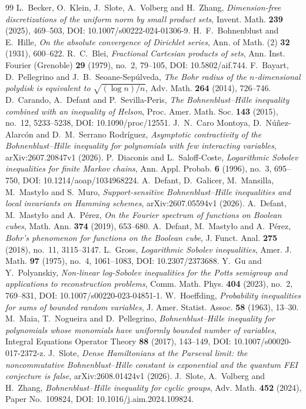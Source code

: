 \documentclass[11pt,a4paper]{article}
\numberwithin{equation}{section}
\theoremstyle{cleanplain}
\theoremstyle{cleandefinition}
\theoremstyle{cleanremark}
\begin{document}
\begin{thebibliography}{99}
\small
{}
L.~Becker, O.~Klein, J.~Slote, A.~Volberg and H.~Zhang,
\emph{Dimension-free discretizations of the uniform norm by small product sets},
Invent. Math. \textbf{239} (2025), 469--503,
DOI: 10.1007/s00222-024-01306-9.
H.~F.~Bohnenblust and E.~Hille,
\emph{On the absolute convergence of Dirichlet series},
Ann. of Math. (2) \textbf{32} (1931), 600--622.
R.~C.~Blei,
\emph{Fractional Cartesian products of sets},
Ann. Inst. Fourier (Grenoble) \textbf{29} (1979), no.~2, 79--105,
DOI: 10.5802/aif.744.
F.~Bayart, D.~Pellegrino and J.~B.~Seoane-Sep\'ulveda,
\emph{The Bohr radius of the $n$-dimensional polydisk is equivalent to
$\sqrt{(\log n)/n}$},
Adv. Math. \textbf{264} (2014), 726--746.
D.~Carando, A.~Defant and P.~Sevilla-Peris,
\emph{The Bohnenblust--Hille inequality combined with an inequality of Helson},
Proc. Amer. Math. Soc. \textbf{143} (2015), no.~12, 5233--5238,
DOI: 10.1090/proc/12551.
J.~N.~Caro Montoya, D.~N\'u\~nez-Alarc\'on and D.~M.~Serrano Rodr\'iguez,
\emph{Asymptotic contractivity of the Bohnenblust--Hille inequality for
polynomials with few interacting variables},
arXiv:2607.20847v1 (2026).
P.~Diaconis and L.~Saloff-Coste,
\emph{Logarithmic Sobolev inequalities for finite Markov chains},
Ann. Appl. Probab. \textbf{6} (1996), no.~3, 695--750,
DOI: 10.1214/aoap/1034968224.
A.~Defant, D.~Galicer, M.~Mansilla, M.~Masty\l o and S.~Muro,
\emph{Support-sensitive Bohnenblust--Hille inequalities and local invariants
on Hamming schemes},
arXiv:2607.05594v1 (2026).
A.~Defant, M.~Masty\l o and A.~P\'erez,
\emph{On the Fourier spectrum of functions on Boolean cubes},
Math. Ann. \textbf{374} (2019), 653--680.
A.~Defant, M.~Masty\l o and A.~P\'erez,
\emph{Bohr's phenomenon for functions on the Boolean cube},
J. Funct. Anal. \textbf{275} (2018), no.~11, 3115--3147.
L.~Gross,
\emph{Logarithmic Sobolev inequalities},
Amer. J. Math. \textbf{97} (1975), no.~4, 1061--1083,
DOI: 10.2307/2373688.
Y.~Gu and Y.~Polyanskiy,
\emph{Non-linear log-Sobolev inequalities for the Potts semigroup and applications to reconstruction problems},
Comm. Math. Phys. \textbf{404} (2023), no.~2, 769--831,
DOI: 10.1007/s00220-023-04851-1.
W.~Hoeffding,
\emph{Probability inequalities for sums of bounded random variables},
J. Amer. Statist. Assoc. \textbf{58} (1963), 13--30.
M.~Maia, T.~Nogueira and D.~Pellegrino,
\emph{Bohnenblust--Hille inequality for polynomials whose monomials have
uniformly bounded number of variables},
Integral Equations Operator Theory \textbf{88} (2017), 143--149,
DOI: 10.1007/s00020-017-2372-z.
J.~Slote,
\emph{Dense Hamiltonians at the Parseval limit: the noncommutative
Bohnenblust--Hille constant is exponential and the quantum FEI conjecture is
false},
arXiv:2608.01424v1 (2026).
J.~Slote, A.~Volberg and H.~Zhang,
\emph{Bohnenblust--Hille inequality for cyclic groups},
Adv. Math. \textbf{452} (2024), Paper No.~109824,
DOI: 10.1016/j.aim.2024.109824.
\end{thebibliography}
\end{document}
